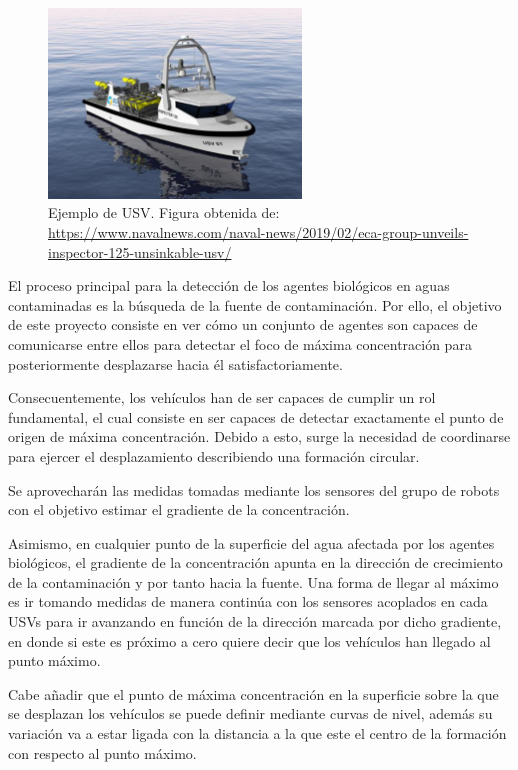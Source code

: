 \begin{figure}[htb]
\centering
\includegraphics[width=0.6\textwidth]{figures/USV.eps}
\caption{Ejemplo de USV. Figura obtenida de: \url{https://www.navalnews.com/naval-news/2019/02/eca-group-unveils-inspector-125-unsinkable-usv/}}\label{fig:USV}
\end{figure}

El proceso principal para la detección de los agentes biológicos en aguas contaminadas es la búsqueda de la fuente de contaminación. Por ello, el objetivo de este proyecto consiste en ver cómo un conjunto de agentes son capaces de comunicarse entre ellos para detectar el foco de máxima concentración para posteriormente desplazarse hacia él satisfactoriamente.

Consecuentemente, los vehículos han de ser capaces de cumplir un rol fundamental, el cual consiste en ser capaces de detectar exactamente el punto de origen de máxima concentración. Debido a esto, surge la necesidad de coordinarse para ejercer el desplazamiento describiendo una formación circular.

Se aprovecharán las medidas tomadas mediante los sensores del grupo de robots con el objetivo estimar el gradiente de la concentración.

Asimismo, en cualquier punto de la superficie del agua afectada por los agentes biológicos, el gradiente de la concentración apunta en la dirección de crecimiento de la contaminación y por tanto hacia la fuente. Una forma de llegar al máximo es ir tomando medidas de manera continúa con los sensores acoplados en cada USVs para ir avanzando en función de la dirección marcada por dicho gradiente, en donde si este es próximo a cero quiere decir que los vehículos han llegado al punto máximo.

Cabe añadir que el punto de máxima concentración en la superficie sobre la que se desplazan los vehículos se puede definir mediante curvas de nivel, además su variación va a estar ligada con la distancia a la que este el centro de la formación con respecto al punto máximo.

